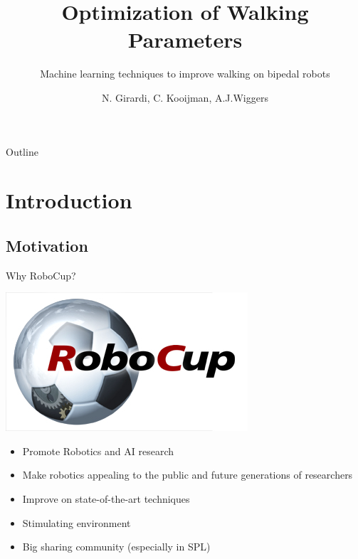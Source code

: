 \documentclass{beamer}
\title[Optimization of Walking Parameters]
{Optimization of Walking Parameters}
\subtitle{Machine learning techniques to improve walking on bipedal robots}
\author[Girardi, Kooijman, Wiggers]{N. Girardi, C. Kooijman, A.J.Wiggers}
\institute[University of Amsterdam]
{
	Artificial Intelligence\\
	Faculty of Science (FNWI) \\
	University of Amsterdam
}
\begin{document}
\maketitle

\begin{frame}{Outline}
	\setcounter{tocdepth}{1}
	\tableofcontents
\end{frame}

\section{Introduction}

\subsection{Motivation}
\begin{frame}{Why RoboCup?}
	\begin{center}
		\includegraphics[scale=.2]{robocuplogo}
	\end{center}
	\begin{itemize}
		\item Promote Robotics and AI research
		\item Make robotics appealing to the public and future generations of
			researchers
		\item Improve on state-of-the-art techniques
		\item Stimulating environment
		\item Big sharing community (especially in SPL)
	\end{itemize}
\end{frame}
\end{document}
